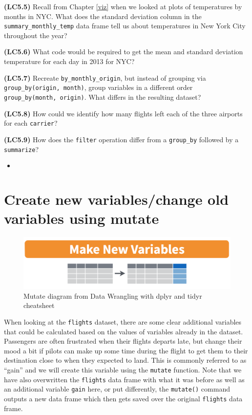 \documentclass[12pt,]{krantz}
\newenvironment{rmdblock}[1]
  {\begin{shaded*}
  \begin{itemize}
  \renewcommand{\labelitemi}{
    \raisebox{-.7\height}[0pt][0pt]{
    }
  }
  \item
  }
  {
  \end{itemize}
  \end{shaded*}
  }
\newenvironment{learncheck}
  {\begin{rmdblock}{warning}}
  {\end{rmdblock}}
\theoremstyle{definition}
\theoremstyle{definition}
\theoremstyle{definition}
\theoremstyle{remark}
\begin{document}
\textbf{(LC5.5)} Recall from Chapter \ref{viz} when we looked at plots
of temperatures by months in NYC. What does the standard deviation
column in the \texttt{summary\_monthly\_temp} data frame tell us about
temperatures in New York City throughout the year?

\textbf{(LC5.6)} What code would be required to get the mean and
standard deviation temperature for each day in 2013 for NYC?

\textbf{(LC5.7)} Recreate \texttt{by\_monthly\_origin}, but instead of
grouping via \texttt{group\_by(origin,\ month)}, group variables in a
different order \texttt{group\_by(month,\ origin)}. What differs in the
resulting dataset?

\textbf{(LC5.8)} How could we identify how many flights left each of the
three airports for each \texttt{carrier}?

\textbf{(LC5.9)} How does the \texttt{filter} operation differ from a
\texttt{group\_by} followed by a \texttt{summarize}?

\begin{learncheck}

\end{learncheck}

\section{Create new variables/change old variables using
mutate}\label{mutate}

\begin{figure}

{\centering \includegraphics[width=\textwidth]{images/mutate} 

}

\caption{Mutate diagram from Data Wrangling with dplyr and tidyr cheatsheet}\label{fig:select}
\end{figure}

When looking at the \texttt{flights} dataset, there are some clear
additional variables that could be calculated based on the values of
variables already in the dataset. Passengers are often frustrated when
their flights departs late, but change their mood a bit if pilots can
make up some time during the flight to get them to their destination
close to when they expected to land. This is commonly referred to as
``gain'' and we will create this variable using the \texttt{mutate}
function. Note that we have also overwritten the \texttt{flights} data
frame with what it was before as well as an additional variable
\texttt{gain} here, or put differently, the \texttt{mutate()} command
outputs a new data frame which then gets saved over the original
\texttt{flights} data frame.
\end{document}
